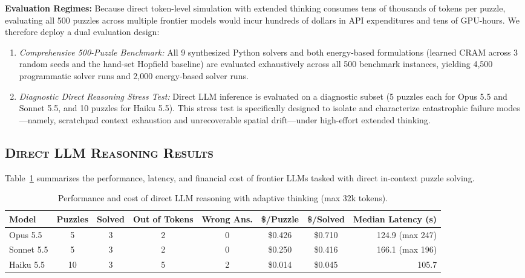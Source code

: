 \documentclass{article} %
\begin{document}
\textbf{Evaluation Regimes:} Because direct token-level simulation with extended thinking consumes tens of thousands of tokens per puzzle, evaluating all 500 puzzles across multiple frontier models would incur hundreds of dollars in API expenditures and tens of GPU-hours. We therefore deploy a dual evaluation design:
\begin{enumerate}
    \item \textit{Comprehensive 500-Puzzle Benchmark:} All 9 synthesized Python solvers and both energy-based formulations (learned CRAM across 3 random seeds and the hand-set Hopfield baseline) are evaluated exhaustively across all 500 benchmark instances, yielding 4,500 programmatic solver runs and 2,000 energy-based solver runs.
    \item \textit{Diagnostic Direct Reasoning Stress Test:} Direct LLM inference is evaluated on a diagnostic subset (5 puzzles each for Opus 5.5 and Sonnet 5.5, and 10 puzzles for Haiku 5.5). This stress test is specifically designed to isolate and characterize catastrophic failure modes—namely, scratchpad context exhaustion and unrecoverable spatial drift—under high-effort extended thinking.
\end{enumerate}

\subsection{\textsc{Direct LLM Reasoning Results}}
\label{subsec:direct_llm_results}

Table~\ref{tab:direct_llm_results} summarizes the performance, latency, and financial cost of frontier LLMs tasked with direct in-context puzzle solving.

\begin{table}[t]
\caption{Performance and cost of direct LLM reasoning with adaptive thinking (max 32k tokens).}
\label{tab:direct_llm_results}
\begin{center}
\footnotesize
\setlength{\tabcolsep}{2.5pt}
\begin{tabular}{lccccccr}
\toprule
\textbf{Model} & \textbf{Puzzles} & \textbf{Solved} & \textbf{Out of Tokens} & \textbf{Wrong Ans.} & \textbf{\$/Puzzle} & \textbf{\$/Solved} & \textbf{Median Latency (s)} \\
\midrule
Opus 5.5   & 5  & 3 & 2 & 0 & \$0.426 & \$0.710 & 124.9 (max 247) \\
Sonnet 5.5 & 5  & 3 & 2 & 0 & \$0.250 & \$0.416 & 166.1 (max 196) \\
Haiku 5.5  & 10 & 3 & 5 & 2 & \$0.014 & \$0.045 & 105.7 \\
\bottomrule
\end{tabular}
\end{center}
\end{table}
\end{document}
